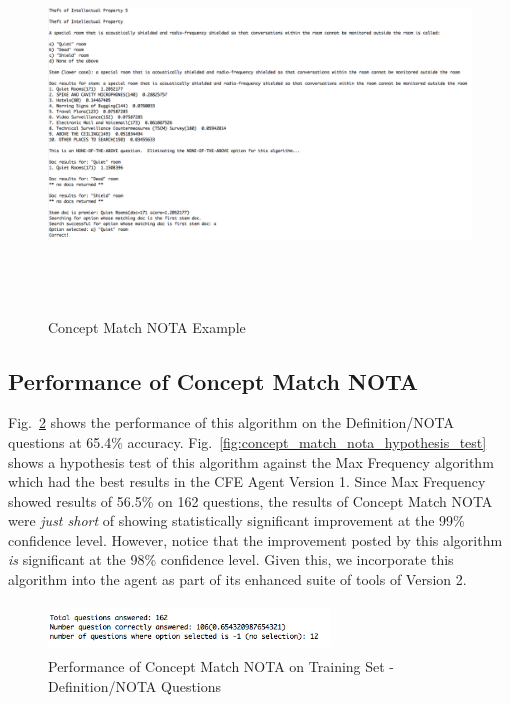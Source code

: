 \begin{figure}
\centering
\vspace{0.75in}
\includegraphics[width=125mm, height=100mm]{concept_match_nota_example.png}
\caption{Concept Match NOTA Example}
\label{fig:concept_match_nota_example}
\end{figure}

\subsection{Performance of Concept Match NOTA}

Fig.~\ref{fig:concept_match_nota_training_set_performance} shows the performance of this algorithm on the Definition/NOTA questions at 65.4\% accuracy.  Fig.~\ref{fig:concept_match_nota_hypothesis_test} shows a hypothesis test of this algorithm against the Max Frequency algorithm which had the best results in the CFE Agent Version 1.  Since Max Frequency showed results of 56.5\% on 162 questions, the results of Concept Match NOTA were \emph{just short} of showing statistically significant improvement at the 99\% confidence level.  However, notice that the improvement posted by this algorithm \emph{is} significant at the 98\% confidence level.  Given this, we incorporate this algorithm into the agent as part of its enhanced suite of tools of Version 2.

\begin{figure}
\centering
\vspace{0.75in}
\includegraphics[width=75mm, height=13mm]{concept_match_nota_training_set_performance.png}
\caption{Performance of Concept Match NOTA on Training Set - Definition/NOTA Questions}
\label{fig:concept_match_nota_training_set_performance}
\end{figure}



